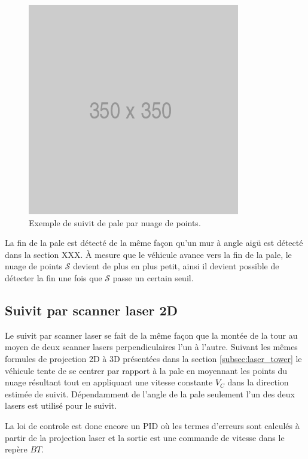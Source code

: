 \begin{figure}[htp]
  \centering
  \includegraphics[width=0.45\linewidth]{images/placeholder.png}
  \caption{Exemple de suivit de pale par nuage de points.}
  \label{fig:pcl_blade_follow}
\end{figure}

La fin de la pale est détecté de la même façon qu'un mur à angle aigü est détecté dans la section \color{red}XXX\color{black}. À mesure que le véhicule avance vers la fin de la pale, le nuage de points $\mathcal{S}$ devient de plus en plus petit, ainsi il devient possible de détecter la fin une fois que $\mathcal{S}$ passe un certain seuil.

\subsection{Suivit par scanner laser 2D}
\label{subsec:laser_blade}

Le suivit par scanner laser se fait de la même façon que la montée de la tour au moyen de deux scanner lasers perpendiculaires l'un à l'autre. Suivant les mêmes formules de projection 2D à 3D présentées dans la section \ref{subsec:laser_tower} le véhicule tente de se centrer par rapport à la pale en moyennant les points du nuage résultant tout en appliquant une vitesse constante $V_C$ dans la direction estimée de suivit. Dépendamment de l'angle de la pale seulement l'un des deux lasers est utilisé pour le suivit.

La loi de controle est donc encore un PID où les termes d'erreurs sont calculés à partir de la projection laser et la sortie est une commande de vitesse dans le repère ${BT}$.

